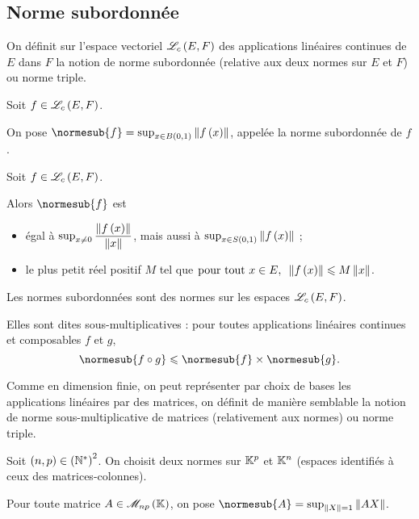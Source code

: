 \subsection{Norme subordonnée}

On définit sur l'espace vectoriel \(\mathscr{L}_c\left(E,F\right)\) des applications linéaires continues de \(E\) dans \(F\) la notion de norme subordonnée (relative aux deux normes sur \(E\) et \(F\)) ou norme triple.

\begin{defi}
Soit \(f\in\mathscr{L}_c\left(E,F\right)\).

On pose \(\normesub{f}=\sup_{x\in\bouleo{0}{1}}\norme{f\paren{x}}\), appelée la norme subordonnée de \(f\).
\end{defi}

\begin{prop}
Soit \(f\in\mathscr{L}_c\left(E,F\right)\).

Alors \(\normesub{f}\) est

\begin{itemize}
    \item égal à \(\sup_{x\not=0}\dfrac{\norme{f\paren{x}}}{\norme{x}}\), mais aussi à \(\sup_{x\in\sphere{0}{1}}\norme{f\paren{x}}\) ; \\
    \item le plus petit réel positif \(M\) tel que \(\quantifs{\tpt x\in E}\norme{f\paren{x}}\leq M\norme{x}\).
\end{itemize}
\end{prop}

\begin{prop}
Les normes subordonnées sont des normes sur les espaces \(\mathscr{L}_c\left(E,F\right)\).

Elles sont dites sous-multiplicatives : pour toutes applications linéaires continues et composables \(f\) et \(g\), \[\normesub{f\rond g}\leq\normesub{f}\times\normesub{g}.\]
\end{prop}

Comme en dimension finie, on peut représenter par choix de bases les applications linéaires par des matrices, on définit de manière semblable la notion de norme sous-multiplicative de matrices (relativement aux normes) ou norme triple.

\begin{defi}
Soit \(\left(n,p\right)\in\left(\mathbb{N}^*\right)^2\). On choisit deux normes sur \(\mathbb{K}^p\) et \(\mathbb{K}^n\) (espaces identifiés à ceux des matrices-colonnes).

Pour toute matrice \(A\in\M{np}\), on pose \(\normesub{A}=\sup_{\norme{X}=1}\norme{AX}\).
\end{defi}

